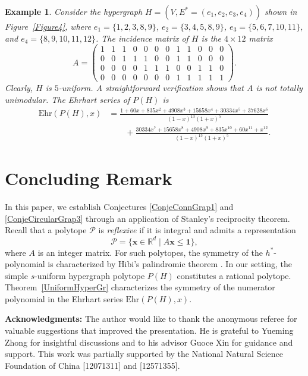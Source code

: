 \documentclass[reqno, 12pt]{amsart}
\theoremstyle{mydefinition}
\theoremstyle{myremark}
\newtheorem{exa}[thm]{Example}
\begin{document}
\begin{exa}
Consider the hypergraph $H = (V, E^* = (e_1, e_2, e_3, e_4))$ shown in Figure~\ref{Figure4}, where $e_1 = \{1,2,3,8,9\}$, $e_2 = \{3,4,5,8,9\}$, $e_3 = \{5,6,7,10,11\}$, and $e_4 = \{8,9,10,11,12\}$.
The incidence matrix of $H$ is the $4 \times 12$ matrix
\[
A=\left(
\begin{array}{cccccccccccc}
1 & 1 & 1 & 0 & 0 & 0 & 0 & 1 & 1 & 0 & 0 & 0 \\
0 & 0 & 1 & 1 & 1 & 0 & 0 & 1 & 1 & 0 & 0 & 0 \\
0 & 0 & 0 & 0 & 1 & 1 & 1 & 0 & 0 & 1 & 1 & 0 \\
0 & 0 & 0 & 0 & 0 & 0 & 0 & 1 & 1 & 1 & 1 & 1
\end{array}
\right).
\]
Clearly, $H$ is $5$-uniform. A straightforward verification shows that $A$ is not totally unimodular. The Ehrhart series of $P(H)$ is
\begin{align*}
\mathrm{Ehr}(P(H),x)&=\frac{1+60x+835x^2+4908x^3+15658x^4+30334x^5+37628x^6}{(1-x)^{13}(1+x)^5}
\\ &\quad\quad + \frac{30334x^7+15658x^8+4908x^9+835x^{10}+60x^{11}+x^{12}}{(1-x)^{13}(1+x)^5}.
\end{align*}
\end{exa}


\section{Concluding Remark}

In this paper, we establish Conjectures \ref{ConjeConnGrap1} and \ref{ConjeCircularGrap3} through an application of Stanley's reciprocity theorem.
Recall that a polytope $\mathcal{P}$ is \emph{reflexive} if it is integral and admits a representation
\[
\mathcal{P} = \{\mathbf{x} \in \mathbb{R}^d \mid A\mathbf{x} \leq \mathbf{1}\},
\]
where $A$ is an integer matrix.
For such polytopes, the symmetry of the $h^*$-polynomial is characterized by Hibi's palindromic theorem \cite[Theorem 4.6]{BeckRobins}.
In our setting, the simple $s$-uniform hypergraph polytope $P(H)$ constitutes a rational polytope.
Theorem~\ref{UniformHyperGr} characterizes the symmetry of the numerator polynomial in the Ehrhart series $\mathrm{Ehr}(P(H), x)$.

{\small
\textbf{Acknowledgments:}
The author would like to thank the anonymous referee for valuable suggestions that improved the presentation.
He is grateful to Yueming Zhong for insightful discussions and to his advisor Guoce Xin for guidance and support.
This work was partially supported by the National Natural Science Foundation of China [12071311] and [12571355].
}
\end{document}
